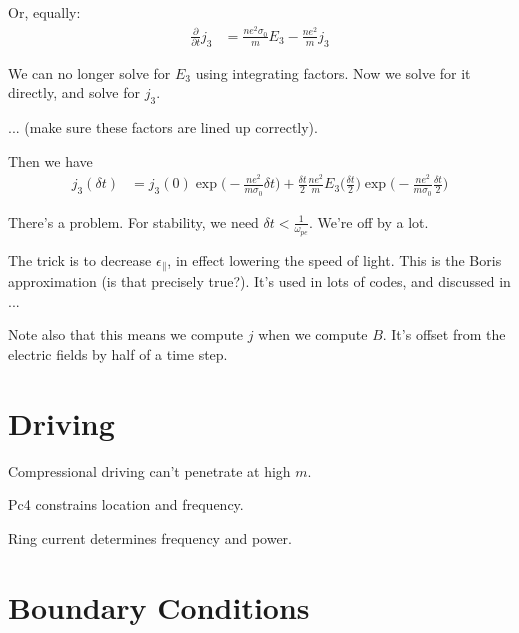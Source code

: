 Or, equally: 
\begin{align}
  \frac{\partial}{\partial t} j_3 & = 
  \frac{n e^2 \sigma_0}{m} E_3 - 
  \frac{n e^2}{m} j_3
\end{align}

We can no longer solve for $E_3$ using integrating factors. Now we solve for it directly, and solve for $j_3$. 

... (make sure these factors are lined up correctly). 

Then we have 
\begin{align}
  j_3(\delta t) & = 
  j_3(0) \exp \big( -\frac{n e^2}{m \sigma_0} \delta t \big) +  
  \frac{\delta t}{2} \frac{n e^2}{m} E_3 
    \big( \frac{\delta t}{2} \big) \exp \big( -\frac{n e^2}{m \sigma_0} \frac{\delta t}{2} \big)
\end{align}

There's a problem. For stability, we need $\delta t < \frac{1}{ \omega_{p e} }$. We're off by a lot. 

The trick is to decrease $\epsilon_\parallel$, in effect lowering the speed of light. This is the Boris approximation (is that precisely true?). It's used in lots of codes, and discussed in ...

Note also that this means we compute $j$ when we compute $B$. It's offset from the electric fields by half of a time step. 

\section{Driving}

Compressional driving can't penetrate at high $m$. 

Pc4 constrains location and frequency. 

Ring current determines frequency and power. 

\section{Boundary Conditions}

